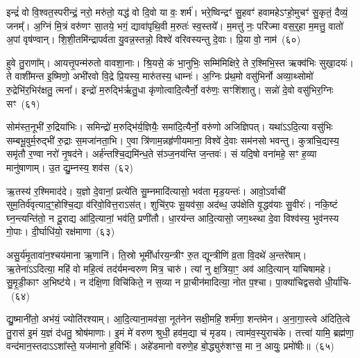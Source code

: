 {\anuvakamend[{ल॒लामः॒ स ए॒व षट्च॑त्वारिꣳशच्च}]}%

इन्द्रं॑ वो वि॒श्वत॒स्परीन्द्रं॒ नरो॒ मरु॑तो॒ यद्ध॑ वो दि॒वो या वः॒ शर्म॑। भरे॒ष्विन्द्रꣳ॑ सु॒हवꣳ॑ हवामहे\-ऽꣳहो॒मुचꣳ॑ सु॒कृतं॒ दैव्यं॒ जनम्᳚। अ॒ग्निं मि॒त्रं वरु॑णꣳ सा॒तये॒ भगं॒ द्यावा॑पृथि॒वी म॒रुतः॑ स्व॒स्तये᳚। म॒मत्तु॑ नः॒ परि॑ज्मा वस॒र्॒\mbox{}हा म॒मत्तु॒ वातो॑ अ॒पां वृष॑ण्वान्। शि॒शी॒तमि॑न्द्रापर्वता यु॒वन्न॒स्तन्नो॒ विश्वे॑ वरिवस्यन्तु दे॒वाः। प्रि॒या वो॒ नाम॑~(६०)

हुवे तु॒राणा᳚म्। आयत्तृ॒पन्म॑रुतो वावशा॒नाः। श्रि॒यसे॒ कं भा॒नुभिः॒ सम्मि॑मिक्षिरे॒ ते र॒श्मिभि॒स्त ऋक्व॑भिः सुखा॒दयः॑। ते वाशी॑मन्त इ॒ष्मिणो॒ अभी॑रवो वि॒द्रे प्रि॒यस्य॒ मारु॑तस्य॒ धाम्नः॑। अ॒ग्निः प्र॑थ॒मो वसु॑भिर्नो अव्या॒थ्सोमो॑ रु॒द्रेभि॑र॒भिर॑क्षतु॒ त्मना᳚। इन्द्रो॑ म॒रुद्भि॑र्\mbox{}ऋतु॒धा कृ॑णोत्वादि॒त्यैर्नो॒ वरु॑णः॒ सꣳशि॑शातु। सन्नो॑ दे॒वो वसु॑भिर॒ग्निः सꣳ~(६१)

सोम॑स्त॒नूभी॑ रु॒द्रिया॑भिः। समिन्द्रो॑ म॒रुद्भि॑र्य॒ज्ञियैः॒ समा॑दि॒त्यैर्नो॒ वरु॑णो अजिज्ञिपत्। यथा॑\-ऽऽ\-दि॒त्या वसु॑भिः सम्बभू॒वुर्म॒रुद्भी॑ रु॒द्राः स॒मजा॑नता॒भि। ए॒वा त्रि॑णाम॒न्नहृ॑णीयमाना॒ विश्वे॑ दे॒वाः सम॑नसो भवन्तु। कुत्रा॑चि॒द्यस्य॒ समृ॑तौ र॒ण्वा नरो॑ नृ॒षद॑ने। अर्\mbox{}ह॑न्तश्चि॒द्यमि॑न्ध॒ते स॑ञ्ज॒नय॑न्ति ज॒न्तवः॑। सं यदि॒षो वना॑महे॒ सꣳ ह॒व्या मानु॑षाणाम्। उ॒त द्यु॒म्नस्य॒ शव॑स~(६२)

ऋ॒तस्य॑ र॒श्मिमाद॑दे। य॒ज्ञो दे॒वानां॒ प्रत्ये॑ति सु॒म्नमादि॑त्यासो॒ भव॑ता मृड॒यन्तः॑। आवो॒\-ऽर्वाची॑ सुम॒तिर्व॑वृत्या\-द॒ꣳ॒होश्चि॒द्या व॑रिवो॒वित्त॒रा\-ऽस॑त्। शुचि॑र॒पः सू॒यव॑सा॒ अद॑ब्ध॒ उप॑क्षेति वृ॒द्धव॑याः सु॒वीरः॑। नकि॒ष्टं घ्न॒न्त्यन्ति॑तो॒ न दू॒राद्य आ॑दि॒त्यानां॒ भव॑ति॒ प्रणी॑तौ। धा॒रय॑न्त आदि॒त्यासो॒ जग॒थ्स्था दे॒वा विश्व॑स्य॒ भुव॑नस्य गो॒पाः। दी॒र्घाधि॑यो॒ रक्ष॑माणा~(६३)

असु॒र्य॑मृ॒तावा॑न॒श्चय॑माना ऋ॒णानि॑। ति॒स्रो भूमी᳚र्धारय॒न्त्रीꣳ रु॒त द्यून्त्रीणि॑ व्र॒ता वि॒दथे॑ अ॒न्तरे॑षाम्। ऋ॒तेना॑\-ऽऽ\-दित्या॒ महि॑ वो महि॒त्वं तद॑र्यमन्वरुण मित्र॒ चारु॑। त्यां नु क्ष॒त्रिया॒ꣳ॒ अव॑ आदि॒त्यान् या॑चिषामहे। सु॒मृ॒डी॒काꣳ अ॒भिष्ट॑ये। न द॑क्षि॒णा विचि॑किते॒ न स॒व्या न प्रा॒चीन॑मादित्या॒ नोत प॒श्चा। पा॒क्या॑चिद्वसवो धी॒र्या॑चि-~(६४)

द्यु॒ष्मानी॑तो॒ अभ॑यं॒ ज्योति॑रश्याम्। आ॒दि॒त्याना॒मव॑सा॒ नूत॑नेन सक्षी॒महि॒ शर्म॑णा॒ शन्त॑मेन। अ॒ना॒गा॒स्त्वे अ॑दिति॒त्वे तु॒रास॑ इ॒मं य॒ज्ञं द॑धतु॒ श्रोष॑माणाः। इ॒मं मे॑ वरुण श्रुधी॒ हव॑म॒द्या च॑ मृडय। त्वाम॑व॒स्युराच॑के। तत्त्वा॑ यामि॒ ब्रह्म॑णा॒ वन्द॑मान॒स्तदा\-ऽऽ\-शा᳚स्ते॒ यज॑मानो ह॒विर्भिः॑। अहे॑डमानो वरुणे॒ह बो॒द्ध्युरु॑शꣳस॒ मा न॒ आयुः॒ प्रमो॑षीः॥~(६५)

